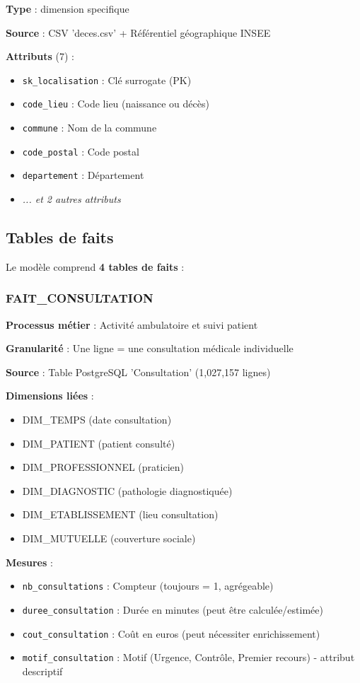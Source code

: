 \textbf{Type} : dimension specifique

\textbf{Source} : CSV 'deces.csv' + Référentiel géographique INSEE

\textbf{Attributs} (7) :
\begin{itemize}[leftmargin=*]
    \item \texttt{sk_localisation} : Clé surrogate (PK)
    \item \texttt{code_lieu} : Code lieu (naissance ou décès)
    \item \texttt{commune} : Nom de la commune
    \item \texttt{code_postal} : Code postal
    \item \texttt{departement} : Département
    \item \textit{... et 2 autres attributs}
\end{itemize}

\subsection{Tables de faits}

Le modèle comprend \textbf{4 tables de faits} :

\subsubsection{FAIT_CONSULTATION}

\textbf{Processus métier} : Activité ambulatoire et suivi patient

\textbf{Granularité} : Une ligne = une consultation médicale individuelle

\textbf{Source} : Table PostgreSQL 'Consultation' (1,027,157 lignes)

\textbf{Dimensions liées} :
\begin{itemize}[leftmargin=*]
    \item DIM_TEMPS (date consultation)
    \item DIM_PATIENT (patient consulté)
    \item DIM_PROFESSIONNEL (praticien)
    \item DIM_DIAGNOSTIC (pathologie diagnostiquée)
    \item DIM_ETABLISSEMENT (lieu consultation)
    \item DIM_MUTUELLE (couverture sociale)
\end{itemize}

\textbf{Mesures} :
\begin{itemize}[leftmargin=*]
    \item \texttt{nb_consultations} : Compteur (toujours = 1, agrégeable)
    \item \texttt{duree_consultation} : Durée en minutes (peut être calculée/estimée)
    \item \texttt{cout_consultation} : Coût en euros (peut nécessiter enrichissement)
    \item \texttt{motif_consultation} : Motif (Urgence, Contrôle, Premier recours) - attribut descriptif
\end{itemize}

